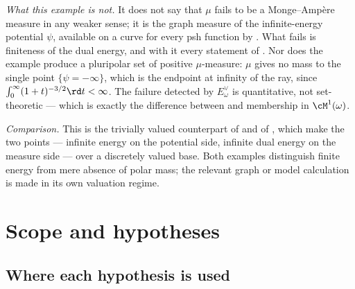 \begin{example}
\emph{What this example is not.}  It does not say that $\mu$ fails to be
a Monge--Amp\`ere measure in any weaker sense; it is the graph measure of the infinite-energy potential $\psi$,
available on a curve for every psh function by
\cite[Example~7.20]{BJ22}.  What fails is finiteness of the dual energy, and with it every
statement of .  Nor does the example produce a pluripolar
set of positive $\mu$-measure: $\mu$ gives no mass to the single point
$\{\psi=-\infty\}$, which is the endpoint at infinity of the ray, since
$\int_0^\infty(1+t)^{-3/2}\rd t<\infty$.  The failure detected by
$E^\vee_\omega$ is quantitative, not set-theoretic --- which is exactly
the difference between  and membership in
$\cM^1(\omega)$.

\emph{Comparison.}  This is the trivially valued counterpart of
 and of
, which make the two points ---
infinite energy on the potential side, infinite dual energy on the measure
side --- over a discretely valued base.  Both examples distinguish finite energy from mere absence of polar mass;
the relevant graph or model calculation is made in its own valuation regime.
\end{example}

\section{Scope and hypotheses}
\label{sec:ch47-scope}

\subsection{Where each hypothesis is used}
\label{sec:ch47-hypothesis-use}

